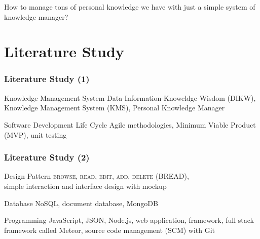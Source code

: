 \documentclass[10pt, compress]{beamer}
\begin{document}

\begin{frame}[fragile]

  \begin{center}
  How to manage tons of personal knowledge we have with just a simple system of knowledge manager?
  \end{center}

\end{frame}


\section{Literature Study}


\begin{frame}[fragile]
  \frametitle{Literature Study (1)}

  \begin{block}{Knowledge Management System}
    Data-Information-Knoweldge-Wisdom (\alert{DIKW}),\\
    Knowledge Management System (\alert{KMS}), \alert{Personal Knowledge Manager}
  \end{block}

  \begin{block}{Software Development Life Cycle}
    \alert{Agile} methodologies, Minimum Viable Product (\alert{MVP}), unit testing
  \end{block}

\end{frame}


\begin{frame}[fragile]
  \frametitle{Literature Study (2)}

  \begin{block}{Design Pattern}
    \textsc{browse, read, edit, add, delete} (\alert{BREAD}),\\
    simple interaction and interface design with mockup
  \end{block}

  \begin{block}{Database}
    \alert{NoSQL}, document database, \alert{MongoDB}
  \end{block}

  \begin{block}{Programming}
    \alert{JavaScript}, \alert{JSON}, \alert{Node.js}, web application, \alert{framework}, full stack framework called \alert{Meteor}, source code management (\alert{SCM}) with \alert{Git}
  \end{block}

\end{frame}
\end{document}
